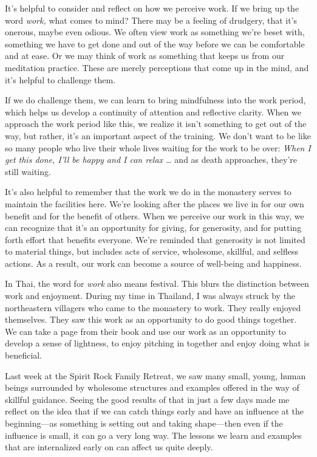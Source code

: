 
It's helpful to consider and reflect on how we perceive work. If we 
bring up the word \emph{work,} what comes to mind? There may be a 
feeling of drudgery, that it's onerous, maybe even odious. We often 
view work as something we're beset with, something we have to get done 
and out of the way before we can be comfortable and at ease. Or we may 
think of work as something that keeps us from our meditation practice. 
These are merely perceptions that come up in the mind, and it's helpful 
to challenge them.

If we do challenge them, we can learn to bring mindfulness into the 
work period, which helps us develop a continuity of attention and 
reflective clarity. When we approach the work period like this, we 
realize it isn't something to get out of the way, but rather, it's an 
important aspect of the training. We don't want to be like so many 
people who live their whole lives waiting for the work to be over: 
\emph{When I get this done, I'll be happy and I can relax \ldots{}} and 
as death approaches, they're still waiting.

It's also helpful to remember that the work we do in the monastery 
serves to maintain the facilities here. We're looking after the places 
we live in for our own benefit and for the benefit of others. When we 
perceive our work in this way, we can recognize that it's an 
opportunity for giving, for generosity, and for putting forth effort 
that benefits everyone. We're reminded that generosity is not limited 
to material things, but includes acts of service, wholesome, skillful, 
and selfless actions. As a result, our work can become a source of 
well-being and happiness.

In Thai, the word for \emph{work} also means festival. This blurs the 
distinction between work and enjoyment. During my time in Thailand, I 
was always struck by the northeastern villagers who came to the 
monastery to work. They really enjoyed themselves. They saw this work 
as an opportunity to do good things together. We can take a page from 
their book and use our work as an opportunity to develop a sense of 
lightness, to enjoy pitching in together and enjoy doing what is 
beneficial.


Last week at the Spirit Rock Family Retreat, we saw many small, young, 
human beings surrounded by wholesome structures and examples offered in 
the way of skillful guidance. Seeing the good results of that in just a 
few days made me reflect on the idea that if we can catch things early 
and have an influence at the beginning---as something is setting out 
and taking shape---then even if the influence is small, it can go a 
very long way. The lessons we learn and examples that are internalized 
early on can affect us quite deeply.

